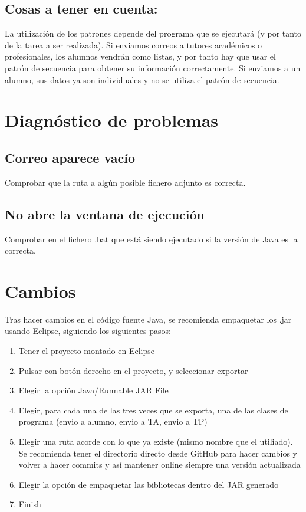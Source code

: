 \documentclass[11pt]{article}
\begin{document}
\subsection{Cosas a tener en cuenta:}
\label{sec-4-3}
La utilización de los patrones depende del programa que se ejecutará (y por tanto de la tarea a ser realizada). Si enviamos correos a tutores académicos o profesionales, los alumnos vendrán como listas, y por tanto hay que usar el patrón de secuencia para obtener su información correctamente. Si enviamos a un alumno, sus datos ya son individuales y no se utiliza el patrón de secuencia.

\section{Diagnóstico de problemas}
\label{sec-5}
\subsection{Correo aparece vacío}
\label{sec-5-1}
Comprobar que la ruta a algún posible fichero adjunto es correcta.
\subsection{No abre la ventana de ejecución}
\label{sec-5-2}
Comprobar en el fichero .bat que está siendo ejecutado si la versión de Java es la correcta.
\section{Cambios}
\label{sec-6}
Tras hacer cambios en el código fuente Java, se recomienda empaquetar los .jar usando Eclipse, siguiendo los siguientes pasos:
\begin{enumerate}
\item Tener el proyecto montado en Eclipse
\item Pulsar con botón derecho en el proyecto, y seleccionar exportar
\item Elegir la opción Java/Runnable JAR File
\item Elegir, para cada una de las tres veces que se exporta, una de las clases de programa (envio a alumno, envio a TA, envio a TP)
\item Elegir una ruta acorde con lo que ya existe (mismo nombre que el utiliado). Se recomienda tener el directorio directo desde GitHub para hacer cambios y volver a hacer commits y así mantener online siempre una versión actualizada
\item Elegir la opción de empaquetar las bibliotecas dentro del JAR generado
\item Finish
\end{enumerate}
\end{document}
